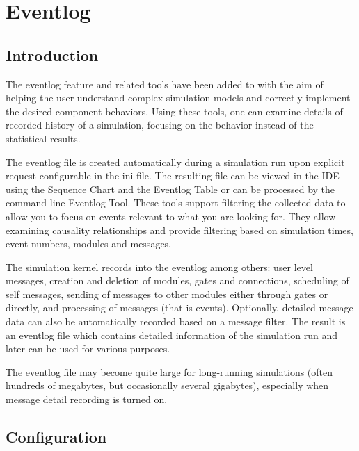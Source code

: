 \chapter{Eventlog}
\label{cha:eventlog}

\section{Introduction}
\label{sec:eventlog:introduction}

The eventlog feature and related tools have been added to {\opp} with the aim of
helping the user understand complex simulation models and correctly implement the
desired component behaviors. Using these tools, one can examine details of recorded
history of a simulation, focusing on the behavior instead of the statistical results.

The eventlog file is created automatically during a simulation run upon explicit request
configurable in the ini file. The resulting file can be viewed in the {\opp} IDE using
the Sequence Chart and the Eventlog Table or can be processed by the command line Eventlog
Tool. These tools support filtering the collected data to allow you to focus on events
relevant to what you are looking for. They allow examining causality relationships and
provide filtering based on simulation times, event numbers, modules and messages.

The simulation kernel records into the eventlog among others: user level messages,
creation and deletion of modules, gates and connections, scheduling of self messages,
sending of messages to other modules either through gates or directly, and processing of
messages (that is events). Optionally, detailed message data can also be automatically
recorded based on a message filter. The result is an eventlog file which contains detailed
information of the simulation run and later can be used for various purposes.

\begin{note}
    The eventlog file may become quite large for long-running simulations
    (often hundreds of megabytes, but occasionally several gigabytes), especially
    when message detail recording is turned on.
\end{note}

\section{Configuration}
\label{sec:eventlog:configuration}

